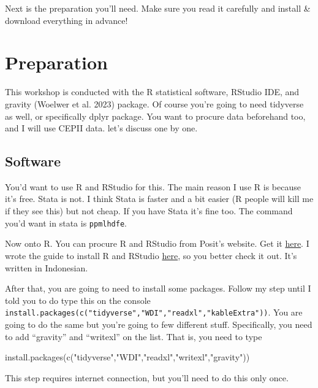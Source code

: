 \documentclass[
  a4paper,
  DIV=11,
  numbers=noendperiod]{scrreprt}
\newenvironment{Shaded}{\begin{snugshade}}{\end{snugshade}}
\newcommand{\FunctionTok}[1]{\textcolor[rgb]{0.28,0.35,0.67}{#1}}
\newcommand{\NormalTok}[1]{\textcolor[rgb]{0.00,0.23,0.31}{#1}}
\newcommand{\StringTok}[1]{\textcolor[rgb]{0.13,0.47,0.30}{#1}}
\begin{document}
Next is the preparation you'll need. Make sure you read it carefully and
install \& download everything in advance!

\hypertarget{req}{%
\section{Preparation}\label{req}}

This workshop is conducted with the R statistical software, RStudio IDE,
and gravity (Woelwer et al. 2023) package. Of course you're going to
need tidyverse as well, or specifically dplyr package. You want to
procure data beforehand too, and I will use CEPII data. let's discuss
one by one.

\hypertarget{software}{%
\subsection{Software}\label{software}}

You'd want to use R and RStudio for this. The main reason I use R is
because it's free. Stata is not. I think Stata is faster and a bit
easier (R people will kill me if they see this) but not cheap. If you
have Stata it's fine too. The command you'd want in stata is
\texttt{ppmlhdfe}.

Now onto R. You can procure R and RStudio from Posit's website. Get it
\href{https://posit.co/download/rstudio-desktop/}{here}. I wrote the
guide to install R and RStudio
\href{https://www.krisna.or.id/courses/metopel/installr/}{here}, so you
better check it out. It's written in Indonesian.

After that, you are going to need to install some packages. Follow my
step until I told you to do type this on the console
\texttt{install.packages(c("tidyverse","WDI","readxl","kableExtra"))}.
You are going to do the same but you're going to few different stuff.
Specifically, you need to add ``gravity'' and ``writexl'' on the list.
That is, you need to type

\begin{Shaded}
\begin{Highlighting}[]
\FunctionTok{install.packages}\NormalTok{(}\FunctionTok{c}\NormalTok{(}\StringTok{"tidyverse"}\NormalTok{,}\StringTok{"WDI"}\NormalTok{,}\StringTok{"readxl"}\NormalTok{,}\StringTok{"writexl"}\NormalTok{,}\StringTok{"gravity"}\NormalTok{))}
\end{Highlighting}
\end{Shaded}

This step requires internet connection, but you'll need to do this only
once.
\end{document}
